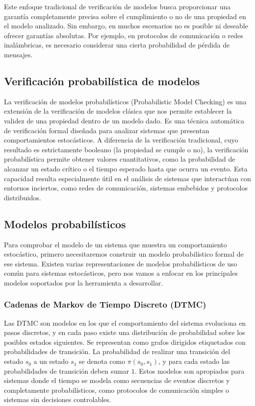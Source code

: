 \documentclass{article}
\begin{document}
Este enfoque tradicional de verificación de modelos busca proporcionar una garantía completamente precisa sobre el cumplimiento o no de una propiedad en el modelo analizado. Sin embargo, en muchos escenarios no es posible ni deseable ofrecer garantías absolutas. Por ejemplo, en protocolos de comunicación o redes inalámbricas, es necesario considerar una cierta probabilidad de pérdida de mensajes.

\subsection{Verificación probabilística de modelos}

La verificación de modelos probabilísticos (Probabilistic Model Checking) es una extensión de la verificación de modelos clásica que nos permite establecer la validez de una propiedad dentro de un modelo dado. Es una técnica automática de verificación formal diseñada para analizar sistemas que presentan comportamientos estocásticos.
A diferencia de la verificación tradicional, cuyo resultado es estrictamente booleano (la propiedad se cumple o no), la verificación probabilística permite obtener valores cuantitativos, como la probabilidad de alcanzar un estado crítico o el tiempo esperado hasta que ocurra un evento. Esta capacidad resulta especialmente útil en el análisis de sistemas que interactúan con entornos inciertos, como redes de comunicación, sistemas embebidos y protocolos distribuidos.

\subsection{Modelos probabilísticos}
Para comprobar el modelo de un sistema que muestra un comportamiento estocástico, primero necesitaremos construir un modelo probabilístico formal de ese sistema. Existen varias representaciones de modelos probabilísticos de uso común para sistemas estocásticos, pero nos vamos a enfocar en los principales modelos soportados por la herramienta a desarrollar.

\subsubsection{Cadenas de Markov de Tiempo Discreto (DTMC)}

Las DTMC son modelos en los que el comportamiento del sistema evoluciona en pasos discretos, y en cada paso existe una distribución de probabilidad sobre los posibles estados siguientes. Se representan como grafos dirigidos etiquetados con probabilidades de transición. La probabilidad de realizar una transición del estado $s_0$ a un estado $s_1$ se denota como $\pi(s_0, s_1)$, y para cada estado las probabilidades de transición deben sumar $1$\cite{KNP02}. Estos modelos son apropiados para sistemas donde el tiempo se modela como secuencias de eventos discretos y completamente probabilísticos, como protocolos de comunicación simples o sistemas sin decisiones controlables.
\end{document}
